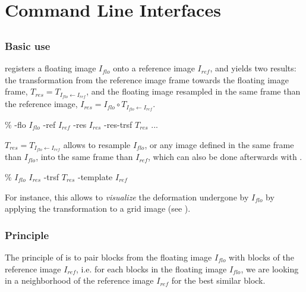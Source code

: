 
\chapter{Command Line Interfaces}





\section{\blockmatching}
\label{sec:blockmatching}

\subsection{Basic use}

\blockmatching registers a floating image $I_{flo}$ onto a reference image $I_{ref}$, and yields two results: the transformation from the reference image frame towards the floating image frame,  $T_{res} = T_{I_{flo} \leftarrow I_{ref}}$, and the floating image resampled in the same frame than the reference image, $I_{res} = I_{flo} \circ T_{I_{flo} \leftarrow I_{ref}}$.

\begin{code}{0.8}
\% \blockmatching -flo $I_{flo}$ -ref $I_{ref}$ -res $I_{res}$ -res-trsf $T_{res}$ ...
\end{code}

$T_{res} = T_{I_{flo} \leftarrow I_{ref}}$ allows to resample $I_{flo}$, or any image defined in the same frame than $I_{flo}$, into the same frame than $I_{ref}$, which can also be done afterwards with \applyTrsf.

\begin{code}{0.8}
\% \applyTrsf $I_{flo}$ $I_{res}$ -trsf $T_{res}$ -template $I_{ref}$
\end{code}

For instance, this allows to \textit{visualize} the deformation undergone by $I_{flo}$ by applying the transformation to a grid image (see \createGrid). 





\subsection{Principle}

The principle of \blockmatching is to pair blocks from the floating
image $I_{flo}$ with blocks of the  reference image $I_{ref}$,
i.e. for each blocks in  the floating
image $I_{flo}$, we are looking in a neighborhood of the reference
image $I_{ref}$ for the best similar block.

